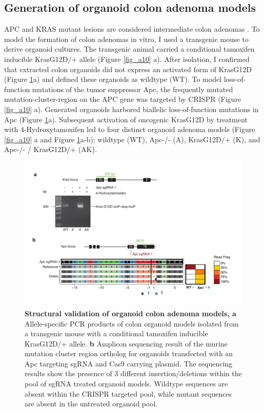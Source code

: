 \begin{flushleft}
\section{Generation of organoid colon adenoma models}
APC and KRAS mutant lesions are considered intermediate colon adenomas \cite{Fearon1989-wf}. To model the formation of colon adenomas in vitro, I used a transgenic mouse to derive organoid cultures. The transgenic animal carried a conditional tamoxifen inducible KrasG12D/+ allele \cite{Jackson2001-wv} (Figure \ref{fig_a10} a). After isolation, I confirmed that extracted colon organoids did not express an activated form of KrasG12D (Figure \ref{fig_a11}a) and defined these organoids as wildtype (WT). To model loss-of-function mutations of the tumor suppressor Apc, the frequently mutated mutation-cluster-region on the APC gene was targeted by CRISPR (Figure \ref{fig_a10} a). Generated organoids harbored biallelic loss-of-function mutations in Apc (Figure \ref{fig_a11}a). Subsequent activation of oncogenic KrasG12D by treatment with 4-Hydroxytamoxifen led to four distinct organoid adenoma models (Figure \ref{fig_a10} a and Figure \ref{fig_a11}a-b); wildtype (WT), Apc-/- (A), KrasG12D/+ (K), and Apc-/- / KrasG12D/+ (AK).


\begin{figure}[h]
\centering
\includegraphics[width=\textwidth,
                height=\textheight,
                keepaspectratio]{figures/adenomaprofiling/pdf/fig_1_1.pdf}
\caption{\textbf{Structural validation of organoid colon adenoma models, a} Allele-specific PCR products of colon organoid models isolated from a transgenic mouse with a conditional tamoxifen inducible KrasG12D/+ allele.
\textbf{b} Amplicon sequencing result of the murine mutation cluster region ortholog for organoids transfected with an Apc targeting sgRNA and Cas9 carrying plasmid. The sequencing results show the presence of 3 different insertion/deletions within the pool of sgRNA treated organoid models. Wildtype sequences are absent within the CRISPR targeted pool, while mutant sequences are absent in the untreated organoid pool.}
\label{fig_a11}
\end{figure}
\bigbreak


\end{flushleft}
